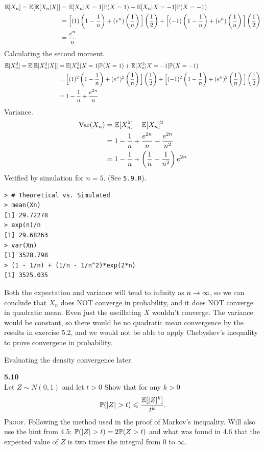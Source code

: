 \newpage\noindent
\begin{align*}
    \E[X_n] = \E[\E[X_n|X]] &=
    \E[X_n|X=1]\P(X=1) + \E[X_n|X=-1]\P(X=-1) \\
    &= \Big[(1)\left(1 - \frac{1}{n}\right) + (e^n)\left(\frac{1}{n}\right)\Big]\left(\frac{1}{2}\right)
    +
    \Big[(-1)\left(1 - \frac{1}{n}\right) + (e^n)\left(\frac{1}{n}\right)\Big]\left(\frac{1}{2}\right) \\
    &= \frac{e^n}{n}
\end{align*}
Calculating the second moment.
\begin{align*}
    \E[X_n^2] = \E[\E[X_n^2|X]] &=
    \E[X_n^2|X=1]\P(X=1) + \E[X_n^2|X=-1]\P(X=-1) \\
    &= \Big[(1)^2\left(1 - \frac{1}{n}\right) + (e^n)^2\left(\frac{1}{n}\right)\Big]\left(\frac{1}{2}\right)
    +
    \Big[(-1)^2\left(1 - \frac{1}{n}\right) + (e^n)^2\left(\frac{1}{n}\right)\Big]\left(\frac{1}{2}\right) \\
    &= 1 - \frac{1}{n} + \frac{e^{2n}}{n}
\end{align*}
Variance.
\begin{align*}
    \V(X_n) &= \E[X_n^2] - \E[X_n]^2 \\
    &= 1 - \frac{1}{n} + \frac{e^{2n}}{n} - \frac{e^{2n}}{n^2} \\
    &= 1 - \frac{1}{n} + \left(\frac{1}{n} - \frac{1}{n^2}\right)e^{2n}
\end{align*}
Verified by simulation for $n=5$. (See \texttt{5.9.R}).
\begin{lstlisting}[style=RSyntax, title=R]
> # Theoretical vs. Simulated
> mean(Xn)
[1] 29.72278
> exp(n)/n
[1] 29.68263
> var(Xn)
[1] 3528.798
> (1 - 1/n) + (1/n - 1/n^2)*exp(2*n)
[1] 3525.035
\end{lstlisting}
Both the expectation and variance will tend to infinity as $n\ra\infty$, so we can conclude
that $X_n$ does NOT converge in probability, and it does NOT converge in quadratic mean.
Even just the oscillating $X$ wouldn't converge. The variance would be constant, so there
would be no quadratic mean convergence by the results in exercise 5.2, and we would not
be able to apply Chebyshev's inequality to prove convergene in probability.

Evaluating the density convergence later.



\newpage\noindent
\textbf{5.10}\\  %
Let $Z\sim N(0,1)$ and let $t>0$ Show that for any $k>0$
$$
\P(|Z| > t) \leq \frac{\E[|Z|^k]}{t^k}.
$$
\textsc{Proof}. Following the method used in the proof of Markov's inequality.
Will also use the hint from 4.5: $\P(|Z| > t) = 2\P(Z > t)$ and what was found
in 4.6 that the expected value of $Z$ is two times the integral from 0 to $\infty$.

